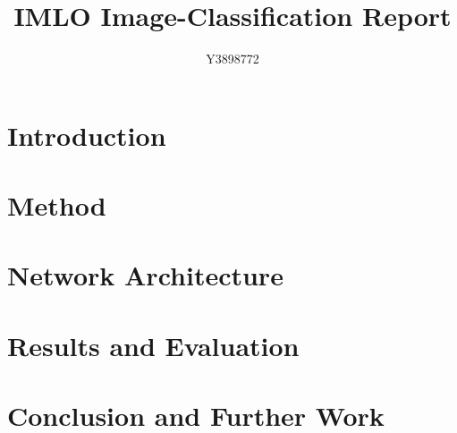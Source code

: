 \documentclass[journal]{IEEEtran}
\title{IMLO Image-Classification Report}
\author{Y3898772}
\begin{document}
\maketitle
\begin{abstract}
\end{abstract}
\section{Introduction}
\cite{IEEEexample:articlelargepages}
\section{Method}
\section{Network Architecture}
\section{Results and Evaluation}
\section{Conclusion and Further Work}


\end{document}
